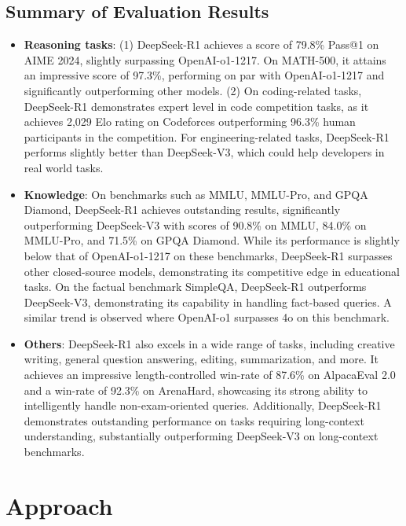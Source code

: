 \documentclass[11pt, a4paper, logo, copyright, nonumbering]{deepseek}
\newcommand{\dsri}{DeepSeek-R1}
\begin{document}
\subsection{Summary of Evaluation Results}
\begin{itemize}[topsep=0pt]
    
    \item \textbf{Reasoning tasks}: 
    (1)
   \dsri{} achieves a score of 79.8\% Pass@1 on AIME 2024, slightly surpassing OpenAI-o1-1217. On MATH-500, it attains an impressive score of 97.3\%, performing on par with OpenAI-o1-1217 and significantly outperforming other models. 
    (2)
    On coding-related tasks, \dsri{} demonstrates expert level in code competition tasks, as it achieves 2,029 Elo rating on Codeforces outperforming 96.3\% human participants in the competition. 
    For engineering-related tasks,  \dsri{} performs slightly better than DeepSeek-V3, which could help developers in real world tasks.
    
    \item \textbf{Knowledge}:
On benchmarks such as MMLU, MMLU-Pro, and GPQA Diamond, \dsri{} achieves outstanding results, significantly outperforming DeepSeek-V3 with scores of 90.8\% on MMLU, 84.0\% on MMLU-Pro, and 71.5\% on GPQA Diamond. While its performance is slightly below that of OpenAI-o1-1217 on these benchmarks, \dsri{} surpasses other closed-source models, demonstrating its competitive edge in educational tasks. On the factual benchmark SimpleQA, \dsri{} outperforms DeepSeek-V3, demonstrating its capability in handling fact-based queries. A similar trend is observed where OpenAI-o1 surpasses 4o on this benchmark.
    \item \textbf{Others}: \dsri{} also excels in a wide range of tasks, including creative writing, general question answering, editing, summarization, and more. It achieves an impressive length-controlled win-rate of 87.6\% on AlpacaEval 2.0 and a win-rate of 92.3\% on ArenaHard, showcasing its strong ability to intelligently handle non-exam-oriented queries. Additionally, \dsri{} demonstrates outstanding performance on tasks requiring long-context understanding, substantially outperforming DeepSeek-V3 on long-context benchmarks.
\end{itemize}


\section{Approach}
\end{document}
